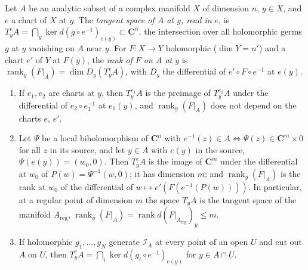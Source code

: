 \begin{lemma}
\label{rem:tangent-space}
\leanok
Let \(A\) be an analytic subset of a complex manifold \(X\) of dimension \(n\), \(y\in X\), and \(e\) a chart of \(X\) at \(y\). The \emph{tangent space of \(A\) at
\(y\), read in \(e\)}, is \(T^e_yA=\bigcap_g\ker d(g\circ e^{-1})_{e(y)}\subset\mathbf C^n\), the intersection over all holomorphic germs \(g\) at \(y\) vanishing on
\(A\) near \(y\). For \(F\colon X\to Y\) holomorphic (\(\dim Y=n'\)) and a chart \(e'\) of \(Y\) at \(F(y)\), the \emph{rank of \(F\) on \(A\) at \(y\)} is
\(\operatorname{rank}_y(F|_A)=\dim D_y(T^e_yA)\), with \(D_y\) the differential of \(e'\circ F\circ e^{-1}\) at \(e(y)\).
\begin{enumerate}
\item If \(e_1,e_2\) are charts at \(y\), then \(T^{e_1}_yA\) is the preimage of \(T^{e_2}_yA\) under the differential of \(e_2\circ e_1^{-1}\) at \(e_1(y)\), and
      \(\operatorname{rank}_y(F|_A)\) does not depend on the charts \(e\), \(e'\).
\item Let \(\Psi\) be a local biholomorphism of \(\mathbf C^n\) with \(e^{-1}(z)\in A\iff\Psi(z)\in\mathbf C^m\times0\) for all \(z\) in its source, and let
      \(y\in A\) with \(e(y)\) in the source, \(\Psi(e(y))=(w_0,0)\). Then \(T^e_yA\) is the image of \(\mathbf C^m\) under the differential at \(w_0\) of
      \(P(w)=\Psi^{-1}(w,0)\); it has dimension \(m\); and \(\operatorname{rank}_y(F|_A)\) is the rank at \(w_0\) of the differential of
      \(w\mapsto e'(F(e^{-1}(P(w))))\). In particular, at a regular point of dimension \(m\) the space \(T_yA\) is the tangent space of the manifold
      \(A_{\mathrm{reg}}\), \(\operatorname{rank}_y(F|_A)=\operatorname{rank}d(F|_{A_{\mathrm{reg}}})_y\le m\).
\item If holomorphic \(g_1,\dots,g_N\) generate \(\mathcal I_A\) at every point of an open \(U\) and cut out \(A\) on \(U\), then
      \(T^e_yA=\bigcap_i\ker d(g_i\circ e^{-1})_{e(y)}\) for \(y\in A\cap U\).
\end{enumerate}
\end{lemma}
